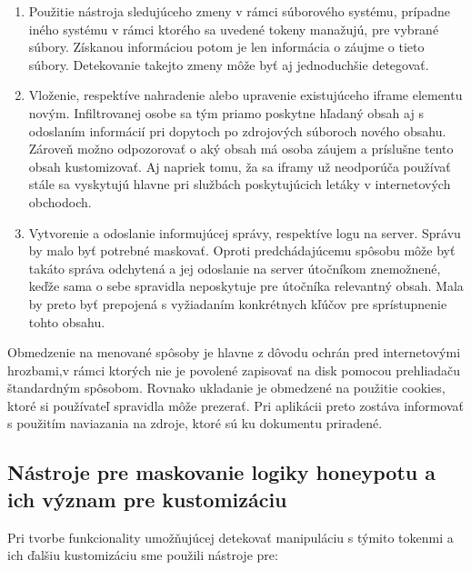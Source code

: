 \documentclass[conference, 11pt,slovak,a4paper,twoside]{IEEEtran}
\begin{document}
\begin{enumerate}
	\item Použitie nástroja sledujúceho zmeny v rámci súborového systému, prípadne iného systému v rámci ktorého sa uvedené tokeny manažujú, pre vybrané súbory. Získanou informáciou potom je len informácia o záujme o tieto súbory. Detekovanie takejto zmeny môže byť aj jednoduchšie detegovať. 
	
	\item Vloženie, respektíve nahradenie alebo upravenie existujúceho iframe elementu novým. Infiltrovanej osobe sa tým priamo poskytne hľadaný obsah aj s odoslaním informácií pri dopytoch po zdrojových súboroch nového obsahu. Zároveň možno odpozorovať o aký obsah má osoba záujem a príslušne tento obsah kustomizovať. Aj napriek tomu, ža sa iframy už neodporúča používať stále sa vyskytujú hlavne pri službách poskytujúcich letáky v internetových obchodoch.

	\item Vytvorenie a odoslanie informujúcej správy, respektíve logu na server. Správu by malo byť potrebné maskovať. Oproti predchádajúcemu spôsobu môže byť takáto správa odchytená a jej odoslanie na server útočníkom znemožnené, keďže sama o sebe spravidla neposkytuje pre útočníka relevantný obsah. Mala by preto byť prepojená s vyžiadaním konkrétnych kľúčov pre sprístupnenie tohto obsahu. 
\end{enumerate}
 
Obmedzenie na menované spôsoby je hlavne z dôvodu ochrán pred internetovými hrozbami,v rámci ktorých nie je povolené zapisovať na disk pomocou prehliadaču štandardným spôsobom. Rovnako ukladanie je obmedzené na použitie cookies, ktoré si používateľ spravidla môže prezerať. Pri aplikácii preto zostáva informovať s použitím naviazania na zdroje, ktoré sú ku dokumentu priradené.
  

\subsection{Nástroje pre maskovanie logiky honeypotu a ich význam pre kustomizáciu}

Pri tvorbe funkcionality umožňujúcej detekovať manipuláciu s týmito tokenmi a ich ďalšiu kustomizáciu sme použili nástroje pre:
\end{document}
